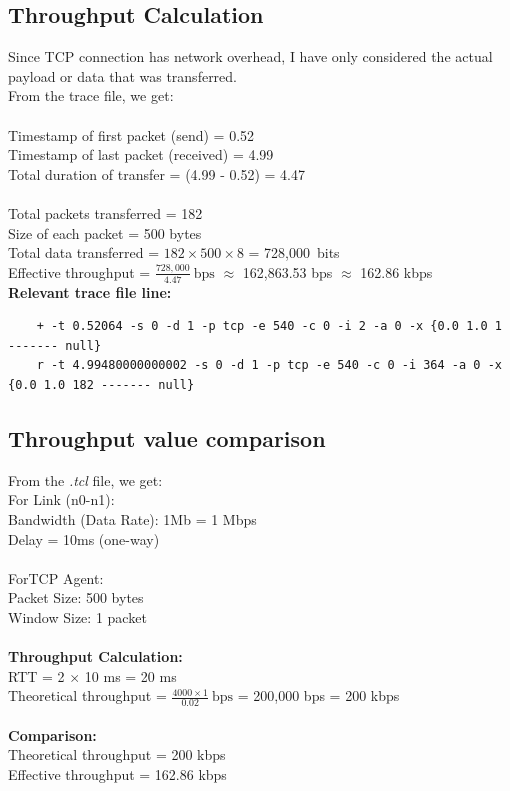 \documentclass[12pt]{article}
\begin{document}
	\subsection{Throughput Calculation}
	Since TCP connection has network overhead, I have only considered the actual payload or data that was transferred. \\
	From the trace file, we get: \\
	\\
	Timestamp of first packet (send) = 0.52 \\
	Timestamp of last packet (received) = 4.99 \\
	Total duration of transfer = (4.99 - 0.52) = 4.47 \\
	\\
	Total packets transferred = 182 \\
	Size of each packet = 500 bytes \\
	Total data transferred = $182\times500\times8$ = 728,000 bits
	\\
	Effective throughput = $\frac{728,000}{4.47}~\mathrm{bps}$ $\approx$ 162,863.53 bps $\approx$ 162.86 kbps
	\\
	\noindent
	\textbf{Relevant trace file line:}
	\begin{lstlisting}
	+ -t 0.52064 -s 0 -d 1 -p tcp -e 540 -c 0 -i 2 -a 0 -x {0.0 1.0 1 ------- null}
	r -t 4.99480000000002 -s 0 -d 1 -p tcp -e 540 -c 0 -i 364 -a 0 -x {0.0 1.0 182 ------- null}
	\end{lstlisting}
	
	
	\subsection{Throughput value comparison}
	From the \textit{.tcl} file, we get: \\
	For Link (n0-n1): \\
	Bandwidth (Data Rate): 1Mb = 1 Mbps \\
	Delay = 10ms (one-way) \\
	\\
	\noindent
	ForTCP Agent: \\
	Packet Size: 500 bytes \\
	Window Size: 1 packet \\
	\\
	\noindent
	\textbf{Throughput Calculation:} \\
	RTT = 2 $\times$ 10 ms = 20 ms \\
	Theoretical throughput = $\frac{4000\times1}{0.02}~\mathrm{bps}$ = 200,000 bps = 200 kbps\\
	\\
	\textbf{Comparison:} \\
	Theoretical throughput = 200 kbps \\
	Effective throughput = 162.86 kbps
	
\end{document}
